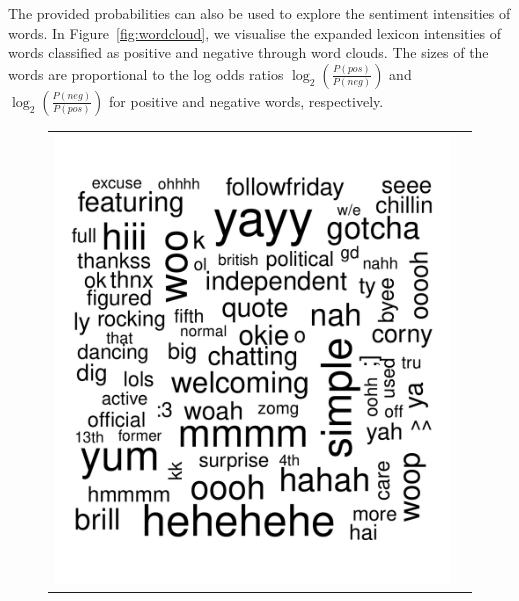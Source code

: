 \documentclass{sig-alternate}
\begin{document}
The provided probabilities can also be used to explore the sentiment intensities of words. In Figure~\ref{fig:wordcloud}, we visualise the expanded lexicon intensities of words classified as positive and negative through word clouds. The sizes of the words are proportional to the log odds ratios $\log_2(\frac{P(pos)}{P(neg)})$ and $\log_2(\frac{P(neg)}{P(pos)})$ for positive and negative words, respectively. 


\begin{figure}[ht]
\begin{center}
\begin{tabular}{cc}
\includegraphics[scale=0.25]{poswords.pdf}
&

\end{tabular}
\end{center}
\end{figure}
\end{document}
